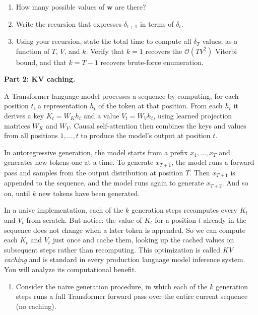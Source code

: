 \documentclass[submit]{../harvardml}
\begin{document}
\begin{framed}
\begin{enumerate}
  \begin{enumerate}
    \item[(i)] How many possible values of $\mathbf{w}$ are there?
    \item[(ii)] Write the recursion that expresses $\delta_{t+1}$ in terms of $\delta_t$.
    \item[(iii)] Using your recursion, state the total time to compute all $\delta_T$ values, as a function of $T$, $V$, and $k$. Verify that $k = 1$ recovers the $\mathcal{O}(TV^2)$ Viterbi bound, and that $k = T-1$ recovers brute-force enumeration.
  \end{enumerate}
\end{enumerate}
\end{framed}

\newpage

\begin{framed}
\noindent \textbf{Part 2: KV caching.}

\noindent A Transformer language model processes a sequence by computing, for each position $t$, a representation $h_t$ of the token at that position. From each $h_t$ it derives a key $K_t = W_K h_t$ and a value $V_t = W_V h_t$, using learned projection matrices $W_K$ and $W_V$. Causal self-attention then combines the keys and values from all positions $1, \ldots, t$ to produce the model's output at position $t$.

In autoregressive generation, the model starts from a prefix $x_1, \ldots, x_T$ and generates new tokens one at a time. To generate $x_{T+1}$, the model runs a forward pass and samples from the output distribution at position $T$. Then $x_{T+1}$ is appended to the sequence, and the model runs again to generate $x_{T+2}$. And so on, until $k$ new tokens have been generated.

In a naive implementation, each of the $k$ generation steps recomputes every $K_t$ and $V_t$ from scratch. But notice: the value of $K_t$ for a position $t$ already in the sequence does not change when a later token is appended. So we can compute each $K_t$ and $V_t$ just once and cache them, looking up the cached values on subsequent steps rather than recomputing. This optimization is called \emph{KV caching} and is standard in every production language model inference system. You will analyze its computational benefit.

\begin{enumerate}
  \item[2a.] Consider the naive generation procedure, in which each of the $k$ generation steps runs a full Transformer forward pass over the entire current sequence (no caching).
  

\end{enumerate}
\end{framed}
\end{document}
